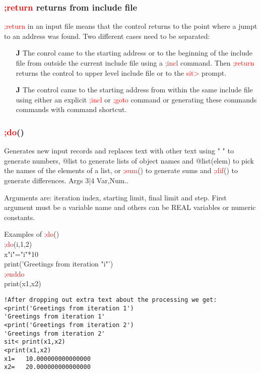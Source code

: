 \subsubsection{\textcolor{Red}{;return} returns from include file}
\label{inpureturn}
\textcolor{Red}{;return} in an input file means that the control returns to the point where a
jumpt to an address was found. Two different cases need to be separated:
\begin{itemize}
\item[\textbf{J}] The conrol came to the starting address or to the beginning of the include file
from outside the current include file using a \textcolor{Red}{;incl} command. Then \textcolor{Red}{;return} returns the control to upper level include
file or to the \textcolor{Red}{sit>} prompt.
\item[\textbf{J}] The control came to the starting address from within the same include file using
either an explicit \textcolor{Red}{;incl} or \textcolor{Red}{;goto} command or generating these commands commands
with command shortcut.
\end{itemize}
\subsubsection{\textcolor{Red}{;do}()}
\label{inpudo}
Generates new input records and replaces text with other text
using " "  to generate numbers, @list to generate lists of object names
and @\textcolor{VioletRed}{list}(elem) to pick the names of the elements of a list, or
\textcolor{Red}{;sum}() to generate sums and \textcolor{Red}{;dif}() to generate differences.
\vspace{0.3cm}
\hline
\vspace{0.3cm}
\noindent Args \tabto{3cm} 3|4 \tabto{5cm}  Var,Num.. \tabto{7cm}
\begin{changemargin}{3cm}{0cm}
\noindent Arguments are: iteration index, starting limit,
final limit and step. First argument must be a variable name and others
can be REAL variables or numeric constants.
\end {changemargin}
\hline
\vspace{0.2cm}
\begin{example}[inpudoex]Examples of \textcolor{Red}{;do}()\\
\label{inpudoex}
\textcolor{Red}{;do}(i,1,2)\\
x"i"="i"*10\\
\textcolor{VioletRed}{print}('Greetings from iteration "i"')\\
\textcolor{Red}{;enddo}\\
\textcolor{VioletRed}{print}(x1,x2)
\color{Green}
\begin{verbatim}
!After dropping out extra text about the processing we get:
<print('Greetings from iteration 1')
'Greetings from iteration 1'
<print('Greetings from iteration 2')
'Greetings from iteration 2'
sit< print(x1,x2)
<print(x1,x2)
x1=   10.000000000000000
x2=   20.000000000000000
\end{verbatim}
\color{Black}
\end{example}
